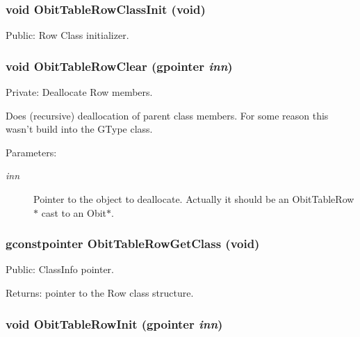 \subsubsection{\setlength{\rightskip}{0pt plus 5cm}void Obit\-Table\-Row\-Class\-Init (void)}\label{ObitTable_8c_a15}


Public: Row Class initializer. 

\subsubsection{\setlength{\rightskip}{0pt plus 5cm}void Obit\-Table\-Row\-Clear (gpointer {\em inn})}\label{ObitTable_8c_a7}


Private: Deallocate Row members. 

Does (recursive) deallocation of parent class members. For some reason this wasn't build into the GType class. \begin{Desc}
\item[Parameters:]
\begin{description}
\item[{\em inn}]Pointer to the object to deallocate. Actually it should be an Obit\-Table\-Row$\ast$ cast to an Obit$\ast$. \end{description}
\end{Desc}
\subsubsection{\setlength{\rightskip}{0pt plus 5cm}gconstpointer Obit\-Table\-Row\-Get\-Class (void)}\label{ObitTable_8c_a14}


Public: Class\-Info pointer. 

\begin{Desc}
\item[Returns:]pointer to the Row class structure. \end{Desc}
\subsubsection{\setlength{\rightskip}{0pt plus 5cm}void Obit\-Table\-Row\-Init (gpointer {\em inn})}\label{ObitTable_8c_a6}


